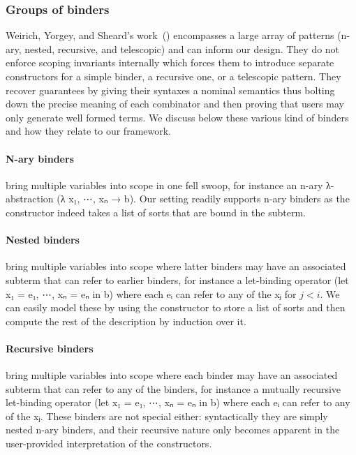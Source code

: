 \subsubsection{Groups of binders}

Weirich, Yorgey, and Sheard's work~(\citeyear{DBLP:conf/icfp/WeirichYS11})
encompasses a large array of patterns (n-ary, nested, recursive, and telescopic)
and can inform our design. They do not enforce scoping invariants internally
which forces them to introduce separate constructors for a simple binder, a
recursive one, or a telescopic pattern. They recover guarantees by giving
their syntaxes a nominal semantics thus bolting down the precise meaning of
each combinator and then proving that users may only generate well formed
terms. We discuss below these various kind of binders and how they relate to
our framework.

\paragraph{N-ary binders} bring multiple variables into scope in one fell
swoop, for instance an n-ary λ-abstraction (λ x₁, ⋯, xₙ → b).
Our setting readily supports n-ary binders as
the  constructor indeed takes a list of sorts that are bound in
the subterm.

\paragraph{Nested binders} bring multiple variables into scope where
latter binders may have an associated subterm that can refer to earlier
binders, for instance a let-binding
operator (let x₁ = e₁, ⋯, xₙ = eₙ in b) where each eᵢ can refer to any
of the xⱼ for $j < i$.
%
We can easily model these by using the  constructor to store a list
of sorts and then compute the rest of the description
by induction over it.

\paragraph{Recursive binders}
bring multiple variables into scope where each binder may have an associated
subterm that can refer to any of the binders, for instance a mutually recursive
let-binding operator  (let x₁ = e₁, ⋯, xₙ = eₙ in b) where each eᵢ can refer to
any of the xⱼ.
%
These binders are not special either: syntactically they are simply nested
n-ary binders, and their recursive nature only becomes apparent in the
user-provided interpretation of the constructors.

